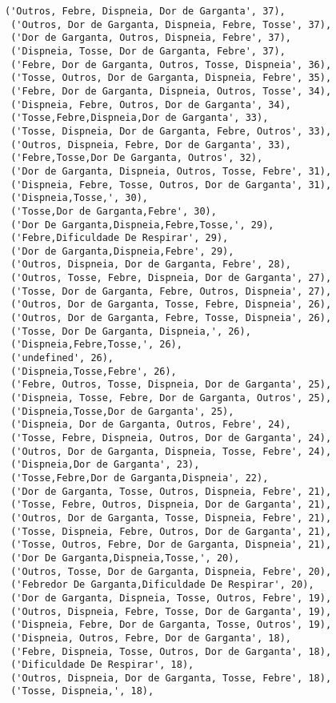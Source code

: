 \documentclass[11pt]{article}
\begin{document}
\begin{tcolorbox}[breakable, size=fbox, boxrule=.5pt, pad at break*=1mm, opacityfill=0]
\begin{Verbatim}[commandchars=\\\{\}]
 ('Outros, Febre, Dispneia, Dor de Garganta', 37),
 ('Outros, Dor de Garganta, Dispneia, Febre, Tosse', 37),
 ('Dor de Garganta, Outros, Dispneia, Febre', 37),
 ('Dispneia, Tosse, Dor de Garganta, Febre', 37),
 ('Febre, Dor de Garganta, Outros, Tosse, Dispneia', 36),
 ('Tosse, Outros, Dor de Garganta, Dispneia, Febre', 35),
 ('Febre, Dor de Garganta, Dispneia, Outros, Tosse', 34),
 ('Dispneia, Febre, Outros, Dor de Garganta', 34),
 ('Tosse,Febre,Dispneia,Dor de Garganta', 33),
 ('Tosse, Dispneia, Dor de Garganta, Febre, Outros', 33),
 ('Outros, Dispneia, Febre, Dor de Garganta', 33),
 ('Febre,Tosse,Dor De Garganta, Outros', 32),
 ('Dor de Garganta, Dispneia, Outros, Tosse, Febre', 31),
 ('Dispneia, Febre, Tosse, Outros, Dor de Garganta', 31),
 ('Dispneia,Tosse,', 30),
 ('Tosse,Dor de Garganta,Febre', 30),
 ('Dor De Garganta,Dispneia,Febre,Tosse,', 29),
 ('Febre,Dificuldade De Respirar', 29),
 ('Dor de Garganta,Dispneia,Febre', 29),
 ('Outros, Dispneia, Dor de Garganta, Febre', 28),
 ('Outros, Tosse, Febre, Dispneia, Dor de Garganta', 27),
 ('Tosse, Dor de Garganta, Febre, Outros, Dispneia', 27),
 ('Outros, Dor de Garganta, Tosse, Febre, Dispneia', 26),
 ('Outros, Dor de Garganta, Febre, Tosse, Dispneia', 26),
 ('Tosse, Dor De Garganta, Dispneia,', 26),
 ('Dispneia,Febre,Tosse,', 26),
 ('undefined', 26),
 ('Dispneia,Tosse,Febre', 26),
 ('Febre, Outros, Tosse, Dispneia, Dor de Garganta', 25),
 ('Dispneia, Tosse, Febre, Dor de Garganta, Outros', 25),
 ('Dispneia,Tosse,Dor de Garganta', 25),
 ('Dispneia, Dor de Garganta, Outros, Febre', 24),
 ('Tosse, Febre, Dispneia, Outros, Dor de Garganta', 24),
 ('Outros, Dor de Garganta, Dispneia, Tosse, Febre', 24),
 ('Dispneia,Dor de Garganta', 23),
 ('Tosse,Febre,Dor de Garganta,Dispneia', 22),
 ('Dor de Garganta, Tosse, Outros, Dispneia, Febre', 21),
 ('Tosse, Febre, Outros, Dispneia, Dor de Garganta', 21),
 ('Outros, Dor de Garganta, Tosse, Dispneia, Febre', 21),
 ('Tosse, Dispneia, Febre, Outros, Dor de Garganta', 21),
 ('Tosse, Outros, Febre, Dor de Garganta, Dispneia', 21),
 ('Dor De Garganta,Dispneia,Tosse,', 20),
 ('Outros, Tosse, Dor de Garganta, Dispneia, Febre', 20),
 ('Febredor De Garganta,Dificuldade De Respirar', 20),
 ('Dor de Garganta, Dispneia, Tosse, Outros, Febre', 19),
 ('Outros, Dispneia, Febre, Tosse, Dor de Garganta', 19),
 ('Dispneia, Febre, Dor de Garganta, Tosse, Outros', 19),
 ('Dispneia, Outros, Febre, Dor de Garganta', 18),
 ('Febre, Dispneia, Tosse, Outros, Dor de Garganta', 18),
 ('Dificuldade De Respirar', 18),
 ('Outros, Dispneia, Dor de Garganta, Tosse, Febre', 18),
 ('Tosse, Dispneia,', 18),

\end{Verbatim}
\end{tcolorbox}
\end{document}

